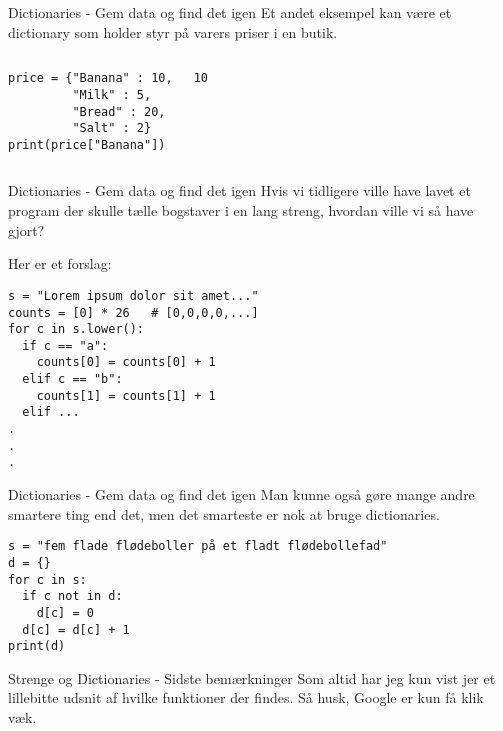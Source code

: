 \begin{frame}[fragile]{Dictionaries - Gem data og find det igen}
	Et andet eksempel kan være et dictionary som holder styr på varers priser i en butik.
	\begin{columns}
		\begin{lstlisting}[style=python]
price = {"Banana" : 10,
         "Milk" : 5,
         "Bread" : 20,
         "Salt" : 2}
print(price["Banana"])
		\end{lstlisting}
		
		\pause
		\begin{lstlisting}[style=python]
10
		\end{lstlisting}
	\end{columns}	
\end{frame}

\begin{frame}[fragile]{Dictionaries - Gem data og find det igen}
	Hvis vi tidligere ville have lavet et program der skulle tælle bogstaver i en lang streng, hvordan ville vi så have gjort?
	\pause
	
	Her er et forslag:
	\begin{lstlisting}[style=python]
s = "Lorem ipsum dolor sit amet..."
counts = [0] * 26	# [0,0,0,0,...]
for c in s.lower():
  if c == "a":
    counts[0] = counts[0] + 1
  elif c == "b":
    counts[1] = counts[1] + 1
  elif ...
.
.
.
	\end{lstlisting}
\end{frame}


\begin{frame}[fragile]{Dictionaries - Gem data og find det igen}
	Man kunne også gøre mange andre smartere ting end det, men det smarteste er nok at bruge dictionaries.
	\pause
	\begin{lstlisting}[style=python]
s = "fem flade flødeboller på et fladt flødebollefad"
d = {}
for c in s:
  if c not in d:
    d[c] = 0
  d[c] = d[c] + 1
print(d)
	\end{lstlisting}
\end{frame}

\begin{frame}[fragile]{Strenge og Dictionaries - Sidste bemærkninger}
	Som altid har jeg kun vist jer et lillebitte udsnit af hvilke funktioner der findes. Så husk, Google er kun få klik væk.
\end{frame}




